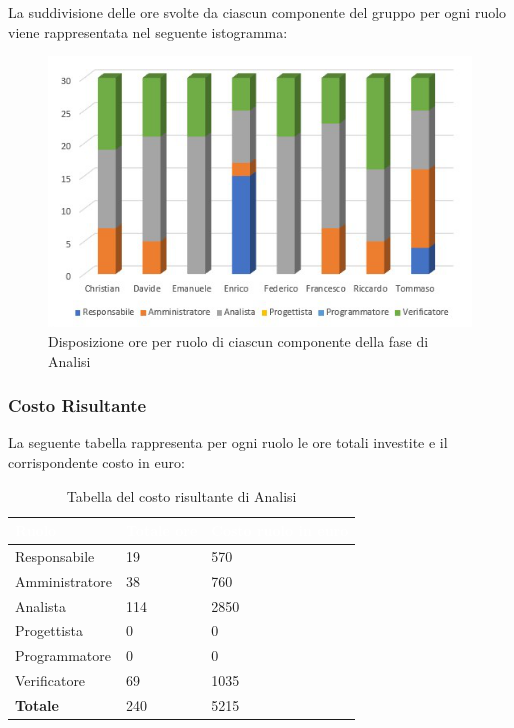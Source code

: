 La suddivisione delle ore svolte da ciascun componente del gruppo per ogni ruolo viene rappresentata nel seguente istogramma:
\begin{figure}[h]
	\centering	
	\includegraphics[scale=2.60]{Sezioni/Istogrammi/IstogrammaAnalisi.png}
	\caption{Disposizione ore per ruolo di ciascun componente della fase di Analisi}
\end{figure}

\clearpage

\subsubsection{Costo Risultante}
La seguente tabella rappresenta per ogni ruolo le ore totali investite e il corrispondente costo in euro:
{
\renewcommand{\arraystretch}{2}
\centering
\begin{longtable}{ C{3cm} C{2cm} C{4cm}}
\caption{Tabella del costo risultante di Analisi}\\

\textcolor{white}{\textbf{Ruolo}} & 
\textcolor{white}{\textbf{Totale ore}} & 
\textcolor{white}{\textbf{Costo ruolo in euro}}\\	
\endhead

Responsabile    &  19 &  570 \\
Amministratore  &  38 &  760 \\
Analista        & 114 & 2850 \\
Progettista     &   0 &    0 \\
Programmatore   &   0 &    0 \\
Verificatore    &  69 & 1035 \\
\textbf{Totale} & 240 & 5215 \\
		
\end{longtable}
}

